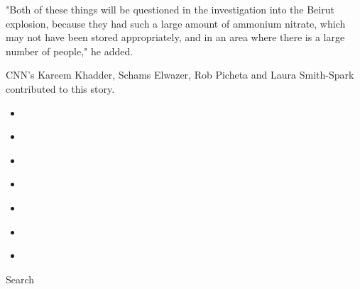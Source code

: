 "Both of these things will be questioned in the investigation into the
Beirut explosion, because they had such a large amount of ammonium
nitrate, which may not have been stored appropriately, and in an area
where there is a large number of people," he added.

CNN's Kareem Khadder, Schams Elwazer, Rob Picheta and Laura Smith-Spark
contributed to this story.

\begin{itemize}
\item
\end{itemize}

\begin{itemize}
\item
\end{itemize}

\begin{itemize}
\item
\end{itemize}

\begin{itemize}
\item
\end{itemize}

\begin{itemize}
\item
\end{itemize}

\begin{itemize}
\item
\end{itemize}

\begin{itemize}
\item
\end{itemize}

Search

